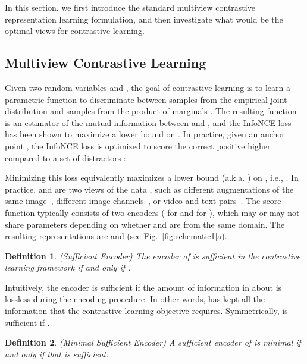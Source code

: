 \documentclass{article}
\newtheorem{definition}{Definition}
\begin{document}
In this section, we first introduce the standard multiview contrastive representation learning formulation, and then investigate what would be the optimal views for contrastive learning.

\subsection{Multiview Contrastive Learning}

Given two random variables  and , the goal of contrastive learning is to learn a parametric function to discriminate between samples from the empirical joint distribution  and samples from the product of marginals . The resulting function is an estimator of the mutual information between  and , and the InfoNCE loss \cite{oord2018representation} has been shown to maximize a lower bound on . In practice, given an anchor point , the InfoNCE loss is optimized to score the correct positive  higher compared to a set of  distractors :




Minimizing this loss equivalently maximizes a lower bound (a.k.a. ) on , i.e., . 
In practice,  and  are two views of the data , such as different augmentations of the same image~\cite{wu2018unsupervised,bachman2019learning,he2019momentum,chen2020improved,chen2020simple}, different image channels~\cite{tian2019contrastive}, or video and text pairs~\cite{sun2019contrastive,miech2019end,li2020learning}. The score function  typically consists of two encoders ( for  and  for ), which may or may not share parameters depending on whether  and  are from the same domain. The resulting representations are  and  (see Fig.~\ref{fig:schematic1}a). 



\begin{definition}\label{def:sufficient}
(Sufficient Encoder) The encoder  of  is sufficient in the contrastive learning framework if and only if .
\end{definition}

\noindent Intuitively, the encoder  is sufficient if the amount of information in  about  is lossless during the encoding procedure. In other words,  has kept all the information that the contrastive learning objective requires. Symmetrically,  is sufficient if .


\begin{definition}\label{def:min_sufficient}
(Minimal Sufficient Encoder) A sufficient encoder  of  is minimal if and only if  that is sufficient.
\end{definition}
\end{document}
